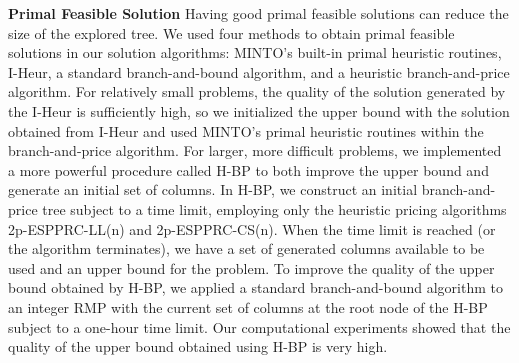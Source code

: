 \documentclass[11pt]{article}
\begin{document}
{\bf Primal Feasible Solution}
Having good primal feasible solutions can reduce the size of the explored tree.  
We used four methods to obtain primal feasible solutions in our solution 
algorithms: MINTO's built-in primal heuristic routines, I-Heur,
a standard branch-and-bound algorithm, and a heuristic branch-and-price algorithm.
For relatively small problems, the quality of the solution 
generated by the I-Heur is sufficiently high, so we initialized the upper bound with the 
solution obtained from I-Heur and used MINTO's primal heuristic routines within the branch-and-price
algorithm. 
For larger, more difficult problems, 
we implemented a more powerful procedure called H-BP to both improve the upper bound
and generate an initial set of columns. 
In H-BP, we construct
an initial branch-and-price tree subject to a time limit, employing only the
 heuristic pricing algorithms 2p-ESPPRC-LL(n) and 2p-ESPPRC-CS(n).  
When the time limit is reached (or the algorithm terminates), we have a set of 
generated columns available to be used and an upper bound for the problem.  
To improve the quality of the upper bound obtained by H-BP, we applied
a standard branch-and-bound algorithm to an integer RMP with the current
set of columns at the root node of the H-BP subject to a one-hour 
time limit.  
Our computational experiments showed that the quality of the 
upper bound obtained using H-BP is very high. 


\end{document}
